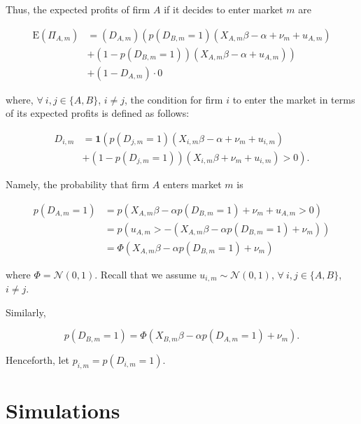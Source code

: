 \documentclass[cm,linguex]{glossa}
\newcommand{\ev}{\text{E}}
\newcommand{\dnorm}{\mathcal{N}}
\begin{document}
Thus, the expected profits of firm \(A\) if it decides to enter market
\(m\) are

\begin{align*}
    \ev\left(\Pi_{A, m}\right) & = \left( D_{A, m} \right) \left( p(D_{B, m} = 1) \left( X_{A, m} \beta - \alpha + \nu_m + u_{A, m} \right) \right. \\ &+ \left. \left( 1 - p(D_{B, m} = 1)\right) \left( X_{A, m} \beta - \alpha + u_{A, m} \right) \right) \\
    &+ \left( 1 - D_{A, m} \right) \cdot 0
\end{align*}

where, \(\forall\ i, j \in \{A, B\}\), \(i \neq j\), the condition for
firm \(i\) to enter the market in terms of its expected profits is
defined as follows:

\begin{align*}
    D_{i, m} & = \mathbf{1} \left( p(D_{j, m} = 1) \left( X_{i, m} \beta - \alpha + \nu_m + u_{i, m} \right) \right. \\ &+ \left. \left( 1 - p(D_{j, m} = 1) \right) \left( X_{i, m} \beta + \nu_m + u_{i, m} \right) > 0 \right) .
\end{align*}

Namely, the probability that firm \(A\) enters market \(m\) is

\begin{align*}
    p \left(D_{A, m} = 1\right) & = p \left( X_{A, m} \beta - \alpha p \left( D_{B, m} = 1 \right) + \nu_m + u_{A, m} > 0 \right)              \\
                                    & = p \left( u_{A, m} > - \left( X_{A, m} \beta - \alpha p \left( D_{B, m} = 1 \right) + \nu_m \right) \right) \\
                                    & = \Phi \left( X_{A, m} \beta - \alpha p \left( D_{B, m} = 1 \right) + \nu_m \right)                              
\end{align*}

where \(\Phi = \dnorm (0, 1)\). Recall that we assume
\(u_{i, m} \sim \dnorm(0, 1)\), \(\forall\ i, j \in \{A, B\}\),
\(i \neq j\).

Similarly,

\[
p \left( D_{B, m} = 1 \right) = \Phi \left( X_{B, m} \beta - \alpha p \left( D_{A, m} = 1 \right) + \nu_m \right) .
\]

Henceforth, let \(p_{i, m} = p(D_{i, m} = 1)\).

\hypertarget{simulations}{%
\section{Simulations}\label{simulations}}
\end{document}
